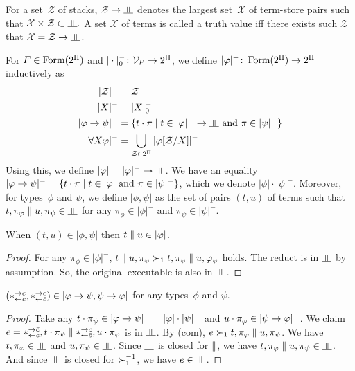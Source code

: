 For a set~$\mathcal Z$ of stacks, $\mathcal Z\imp\bbot$ denotes
the largest set~$\mathcal X$ of term-store pairs such that
$\mathcal X\times\mathcal Z\subset \bbot.$
A set $\mathcal X$ of terms is called a truth value
iff there exists
such $\mathcal Z$ that $\mathcal X = \mathcal Z\imp \bbot$.

\renewcommand{\sem}[1]{|{#1}|}
\newcommand{\nsem}[1]{\sem{#1}^-}
For $F\in\mathop{\text{Form}}(2^\Pi)$ and $|\cdot|^-_0\colon\mathcal V_P\rightarrow 2^\Pi$,
we define $\nsem{\phi}\colon \form(2^\Pi)\rightarrow
2^\Pi$ inductively as
\begin{align*}
 \nsem{\mathcal Z} &= \mathcal Z \\
 \nsem{X}&= |X|_0^- \\
 \nsem{\phi\imp\psi}&=
 \{t\cdot\pi\mid t\in\nsem\phi\rightarrow\bbot \text{ and }\pi\in\nsem\psi\}
 \\
 \nsem{\forall X\phi}&=
 \bigcup_{\mathcal Z\in 2^\Pi} \nsem{\phi[\mathcal Z/X]}
\end{align*}
Using this, we define $\sem \phi=\nsem{\phi}\rightarrow\bbot$.
We have an equality
$\nsem{\phi\imp\psi} = \{t\cdot\pi\mid
t\in\sem\phi\text{ and }\pi\in\nsem\psi\}$, which we denote
$\sem{\phi}\cdot\nsem{\psi}$.
Moreover, for types~$\phi$ and $\psi$, we define $\sem{\phi,\psi}$
as the set of pairs $(t,u)$ of terms such that
$t,\pi_\phi\conc u,\pi_\psi\in\bbot$ for any $\pi_\phi\in\nsem\phi$
and $\pi_\psi\in\nsem\psi$.

\begin{proposition}
 \label{squash}
 When $(t,u)\in\sem{\phi,\psi}$ then $t\conc u\in\sem\phi$.
\end{proposition}
\begin{proof}
 For any $\pi_\phi\in\nsem\phi$,
 $t\parallel u,\pi_\varphi\succ_1 t,\pi_\varphi\parallel u,\varphi_\varphi$ holds.
 The reduct is in $\bbot$ by assumption.
 So, the original executable is also in $\bbot$.
\end{proof}

\newcommand{\comodL}{\comod c{\co c}}
\newcommand{\comodR}{\comod{\co c}c}
\begin{proposition}
 \label{comod-type}
 $(\comodL, \comodR)\in\sem{\phi\imp\psi,\psi\imp\phi}$
 for any types~$\phi$ and $\psi$.
\end{proposition}
\begin{proof}
 Take any $t\cdot\pi_\psi\in\nsem{\phi\imp\psi} =
 \sem\phi\cdot\nsem\psi$
 and $u\cdot\pi_\phi\in\nsem{\psi\imp\phi}$.
 We claim $e=\comodL,t\cdot\pi_\psi\conc\comodR,u\cdot\pi_\phi$ is in
 $\bbot$.
 By (com), $e\succ_1 t,\pi_\varphi\parallel u,\pi_\psi$.
 We have $t,\pi_\phi\in\bbot$ and $u,\pi_\psi\in\bbot$.
 Since $\bbot$ is closed for $\parallel$,
 we have $t,\pi_\phi\conc u,\pi_\psi\in\bbot$.
 And since $\bbot$ is closed for $\succ_1^{-1}$,
 we have $e\in\bbot$.
\end{proof}

